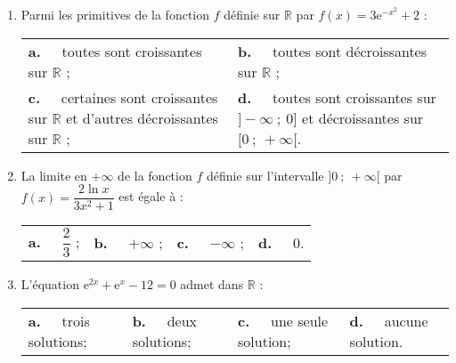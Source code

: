 \documentclass[11pt,a4paper,french]{article}
\newcommand{\R}{\mathbb{R}}
\begin{document}
\begin{enumerate}
\bigskip
\item Parmi les primitives de la fonction $f$ définie sur $\R$  par $f(x) = 3\text{e}^{-x^2} + 2$ :

\begin{center}
\begin{tabularx}{\linewidth}{*{2}{X}}
\textbf{a.~~} toutes sont croissantes sur $\R$ ;&\textbf{b.~~} toutes sont décroissantes sur $\R$ ;\\
\textbf{c.~~} certaines sont croissantes sur $\R$ et d'autres
décroissantes sur $\R$ ;& \textbf{d.~~} toutes sont croissantes sur $]-\infty~;~0]$ et
décroissantes sur $[0~;~+\infty[$.
\end{tabularx}
\end{center}

\item La limite en $+\infty$ de la fonction $f$ définie sur l'intervalle $]0~;~+\infty[$ par $f(x) = \dfrac{2\ln x}{3x^2 + 1}$ est égale à :

\begin{center}
\begin{tabularx}{\linewidth}{*{4}{X}}
\textbf{a.~~} $\dfrac23$ ;&\textbf{b.~~} $+ \infty$ ;&\textbf{c.~~} $- \infty$ ; &\textbf{d.~~} $0$.
\end{tabularx}
\end{center}

\item L'équation $\text{e}^{2x} + \text{e}^x - 12 = 0$ admet dans $\R$ :

\begin{center}
\begin{tabularx}{\linewidth}{*{4}{X}}
\textbf{a.~~} trois solutions; &\textbf{b.~~} deux solutions; &\textbf{c.~~} une seule solution;&\textbf{d.~~} aucune solution.
\end{tabularx}
\end{center}
\end{enumerate}
\end{document}
